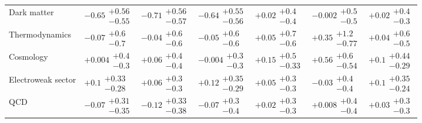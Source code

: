 \begin{table}[H]
\begin{tabular}{lllllll}
Dark matter                               &  $\bm{-0.65}\substack{+0.56 \\ -0.55}$ &  $\bm{-0.71}\substack{+0.56 \\ -0.57}$ &  $\bm{-0.64}\substack{+0.55 \\ -0.56}$ &         $+0.02\substack{+0.4 \\ -0.4}$ &        $-0.002\substack{+0.5 \\ -0.5}$ &         $+0.02\substack{+0.4 \\ -0.3}$ \\
Thermodynamics                            &         $-0.07\substack{+0.6 \\ -0.7}$ &         $-0.04\substack{+0.6 \\ -0.6}$ &         $-0.05\substack{+0.6 \\ -0.6}$ &         $+0.05\substack{+0.7 \\ -0.6}$ &        $+0.35\substack{+1.2 \\ -0.77}$ &         $+0.04\substack{+0.6 \\ -0.5}$ \\
Cosmology                                 &        $+0.004\substack{+0.4 \\ -0.3}$ &         $+0.06\substack{+0.4 \\ -0.4}$ &        $-0.004\substack{+0.3 \\ -0.3}$ &        $+0.15\substack{+0.5 \\ -0.33}$ &   $\bm{+0.56}\substack{+0.6 \\ -0.54}$ &        $+0.1\substack{+0.44 \\ -0.29}$ \\
Electroweak sector                        &        $+0.1\substack{+0.33 \\ -0.28}$ &         $+0.06\substack{+0.3 \\ -0.3}$ &       $+0.12\substack{+0.35 \\ -0.29}$ &         $+0.05\substack{+0.3 \\ -0.3}$ &         $-0.03\substack{+0.4 \\ -0.4}$ &        $+0.1\substack{+0.35 \\ -0.24}$ \\
QCD                                       &       $-0.07\substack{+0.31 \\ -0.35}$ &       $-0.12\substack{+0.33 \\ -0.38}$ &         $-0.07\substack{+0.3 \\ -0.4}$ &         $+0.02\substack{+0.3 \\ -0.3}$ &        $+0.008\substack{+0.4 \\ -0.4}$ &         $+0.03\substack{+0.3 \\ -0.3}$ \\

\end{tabular}
\end{table}
